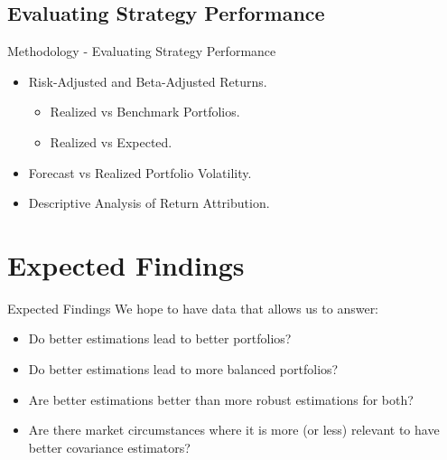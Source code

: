 \documentclass{beamer}
\begin{document}
\subsection{Evaluating Strategy Performance}
\begin{frame}{Methodology - Evaluating Strategy Performance}
    \begin{itemize}
        \item   Risk-Adjusted and Beta-Adjusted Returns.
        \begin{itemize}
            \item Realized vs Benchmark Portfolios.
            \item Realized vs Expected.
        \end{itemize}
        \item   Forecast vs Realized Portfolio Volatility.
        \item   Descriptive Analysis of Return Attribution.
    \end{itemize}
\end{frame}

\section{Expected Findings}
\begin{frame}{Expected Findings}
We hope to have data that allows us to answer:
    \begin{itemize}
        \item Do better estimations lead to better portfolios?
        \item Do better estimations lead to more balanced portfolios?
        \item Are better estimations better than more robust estimations for both?
        \item Are there market circumstances where it is more (or less) relevant to have better covariance estimators?
    \end{itemize}
\end{frame}

\end{document}
